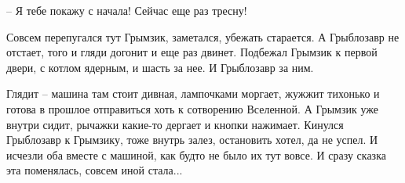\documentclass[ebook,oneside,final,openright]{memoir}
\begin{document}
– Я тебе покажу с начала! Сейчас еще раз тресну!\par
\par
Совсем перепугался тут Грымзик, заметался, убежать старается. А Грыблозавр не отстает, того и гляди догонит и еще раз двинет. Подбежал Грымзик к первой двери, с котлом ядерным, и шасть за нее. И Грыблозавр за ним.\par
\par
Глядит – машина там стоит дивная, лампочками моргает, жужжит тихонько и готова в прошлое отправиться хоть к сотворению Вселенной. А Грымзик уже внутри сидит, рычажки какие-то дергает и кнопки нажимает. Кинулся Грыблозавр к Грымзику, тоже внутрь залез, остановить хотел, да не успел. И исчезли оба вместе с машиной, как будто не было их тут вовсе. И сразу сказка эта поменялась, совсем иной стала...\par
\end{document}
